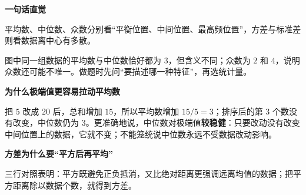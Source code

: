 \begin{explanationbox}

	\textbf{\textcolor{CExplanation}{一句话直觉}}

	平均数、中位数、众数分别看“平衡位置、中间位置、最高频位置”，方差与标准差则看数据离中心有多散。

	

	图中同一组数据的平均数与中位数恰好都为 $3$，但含义不同；众数为 $2$ 和 $4$，说明众数还可能不唯一。做题时先问“要描述哪一种特征”，再选统计量。

	\medskip
	\textbf{\textcolor{CExplanation}{为什么极端值更容易拉动平均数}}

	

	把 $5$ 改成 $20$ 后，总和增加 $15$，所以平均数增加 $15/5=3$；排序后的第 $3$ 个数没有改变，中位数仍为 $3$。更准确地说，中位数对极端值\textbf{较稳健}：只要改动没有改变中间位置上的数据，它就不变；不能笼统说中位数永远不受数据改动影响。

	\medskip
	\textbf{\textcolor{CExplanation}{方差为什么要“平方后再平均”}}

	

	三行对照表明：平方既避免正负抵消，又比绝对距离更强调远离均值的数据；把平方距离除以数据个数，就得到方差。

	

\end{explanationbox}
